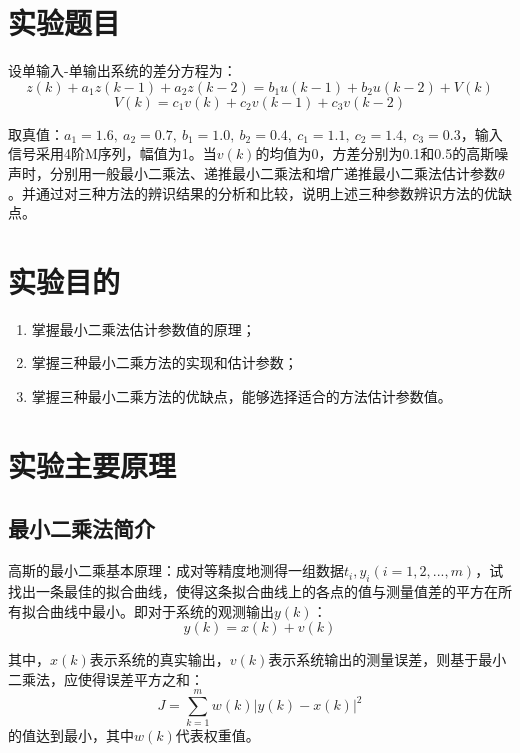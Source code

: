 \documentclass[UTF8]{article}
\begin{document}
\begin{titlepage}

\end{titlepage}

%
\section{实验题目}
设单输入-单输出系统的差分方程为：
\begin{equation*}
    z(k) + a_1z(k-1) + a_2z(k-2) = b_1u(k-1) + b_2u(k-2) + V(k)
\end{equation*}
\begin{equation*}
    V(k) = c_1v(k) + c_2v(k-1) + c_3v(k-2)
\end{equation*}

取真值：$a_1 = 1.6,\ a_2 = 0.7,\ b_1 = 1.0,\ b_2 = 0.4,\ c_1 = 1.1,\ c_2 = 1.4,\ c_3 = 0.3$，输入信号采用4阶M序列，幅值为1。当$v(k)$的均值为0，方差分别为0.1和0.5的高斯噪声时，分别用一般最小二乘法、递推最小二乘法和增广递推最小二乘法估计参数$\theta$。并通过对三种方法的辨识结果的分析和比较，说明上述三种参数辨识方法的优缺点。

%
\section{实验目的}
\begin{enumerate}
    \item 掌握最小二乘法估计参数值的原理；
    \item 掌握三种最小二乘方法的实现和估计参数；
    \item 掌握三种最小二乘方法的优缺点，能够选择适合的方法估计参数值。
\end{enumerate}


%
\section{实验主要原理}
\subsection{最小二乘法简介}
高斯的最小二乘基本原理：成对等精度地测得一组数据$t_i, y_i(i = 1,2,...,m)$，试找出一条最佳的拟合曲线，使得这条拟合曲线上的各点的值与测量值差的平方在所有拟合曲线中最小。即对于系统的观测输出$y(k)$：
\begin{equation*}
    y(k) = x(k) + v(k)
\end{equation*}

其中，$x(k)$表示系统的真实输出，$v(k)$表示系统输出的测量误差，则基于最小二乘法，应使得误差平方之和：
\begin{equation*}
    J = \sum_{k = 1}^m w(k) | y(k) - x(k) |^2
\end{equation*}
的值达到最小，其中$w(k)$代表权重值。
\end{document}
